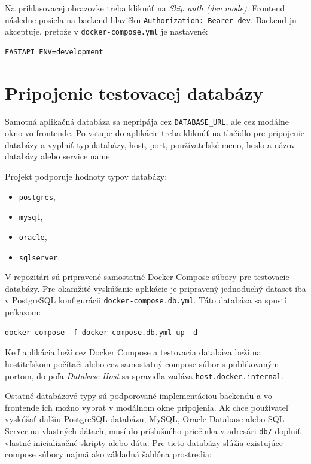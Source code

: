 \documentclass[a4paper, 12pt]{article}
\begin{document}
Na prihlasovacej obrazovke treba kliknúť na \textit{Skip auth (dev mode)}. Frontend následne posiela na backend hlavičku \texttt{Authorization: Bearer dev}. Backend ju akceptuje, pretože v \texttt{docker-compose.yml} je nastavené:

\begin{lstlisting}
FASTAPI_ENV=development
\end{lstlisting}

\section{Pripojenie testovacej databázy}

Samotná aplikačná databáza sa nepripája cez \texttt{DATABASE\_URL}, ale cez modálne okno vo frontende. Po vstupe do aplikácie treba kliknúť na tlačidlo pre pripojenie databázy a vyplniť typ databázy, host, port, používateľské meno, heslo a názov databázy alebo service name.

Projekt podporuje hodnoty typov databázy:

\begin{itemize}
    \item \texttt{postgres},
    \item \texttt{mysql},
    \item \texttt{oracle},
    \item \texttt{sqlserver}.
\end{itemize}

V repozitári sú pripravené samostatné Docker Compose súbory pre testovacie databázy. Pre okamžité vyskúšanie aplikácie je pripravený jednoduchý dataset iba v PostgreSQL konfigurácii \texttt{docker-compose.db.yml}. Táto databáza sa spustí príkazom:

\begin{lstlisting}
docker compose -f docker-compose.db.yml up -d
\end{lstlisting}

Keď aplikácia beží cez Docker Compose a testovacia databáza beží na hostiteľskom počítači alebo cez samostatný compose súbor s publikovaným portom, do poľa \textit{Database Host} sa spravidla zadáva \texttt{host.docker.internal}.

Ostatné databázové typy sú podporované implementáciou backendu a vo frontende ich možno vybrať v modálnom okne pripojenia. Ak chce používateľ vyskúšať ďalšiu PostgreSQL databázu, MySQL, Oracle Database alebo SQL Server na vlastných dátach, musí do príslušného priečinka v adresári \texttt{db/} doplniť vlastné inicializačné skripty alebo dáta. Pre tieto databázy slúžia existujúce compose súbory najmä ako základná šablóna prostredia:
\end{document}
